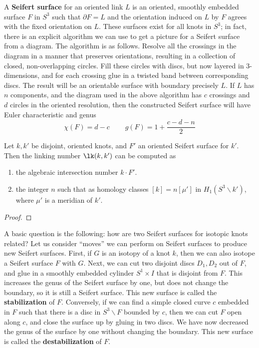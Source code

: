 A \textbf{Seifert surface} for an oriented link $L$ is an oriented, smoothly embedded surface $F$ in $S^3$ such that $\partial F = L$ and the orientation induced on $L$ by $F$ agrees with the fixed orientation on $L$. These surfaces exist for all knots in $S^3$; in fact, there is an explicit algorithm we can use to get a picture for a Seifert surface from a diagram. The algorithm is as follows. Resolve all the crossings in the diagram in a manner that preserves orientations, resulting in a collection of closed, non-overlapping circles. Fill these circles with discs, but now layered in 3-dimensions, and for each crossing glue in a twisted band between corresponding discs. The result will be an orientable surface with boundary precisely $L$. If $L$ has $n$ components, and the diagram used in the above algorithm has $c$ crossings and $d$ circles in the oriented resolution, then the constructed Seifert surface will have Euler characteristic and genus
\begin{equation}
\label{euler characteristic genus seifert surface}
\chi(F) = d - c \ \ \ \ \ \ \ \ \ \ g(F) = 1+\frac{c-d-n}{2}
\end{equation}

\begin{prop}
Let $k,k'$ be disjoint, oriented knots, and $F'$ an oriented Seifert surface for $k'$. Then the linking number $\lk(k,k')$ can be computed as
\begin{enumerate}
	\item the algebraic intersection number $k \cdot F'$.
	\item the integer $n$ such that as homology classes $[k] = n[\mu']$ in $H_1(S^3 \backslash k')$, where $\mu'$ is a meridian of $k'$.
\end{enumerate}
\end{prop}
\begin{proof}

\end{proof}

A basic question is the following: how are two Seifert surfaces for isotopic knots related? Let us consider ``moves'' we can perform on Seifert surfaces to produce new Seifert surfaces. First, if $G$ is an isotopy of a knot $k$, then we can also isotope a Seifert surface $F$ with $G$. Next, we can cut two disjoint discs $D_1,D_2$ out of $F$, and glue in a smoothly embedded cylinder $S^1 \times I$ that is disjoint from $F$. This increases the genus of the Seifert surface by one, but does not change the boundary, so it is still a Seifert surface. This new surface is called the \textbf{stabilization} of $F$. Conversely, if we can find a simple closed curve $c$ embedded in $F$ such that there is a disc in $S^3 \backslash F$ bounded by $c$, then we can cut $F$ open along $c$, and close the surface up by gluing in two discs. We have now decreased the genus of the surface by one without changing the boundary. This new surface is called the \textbf{destabilization} of $F$.

